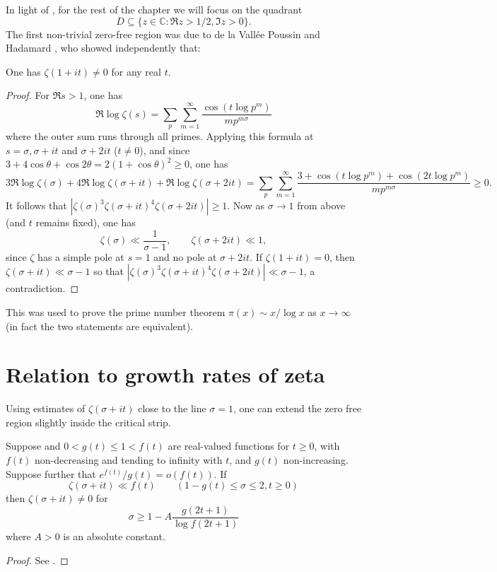 In light of , for the rest of the chapter we will focus on the quadrant
\[
D\subseteq \{z \in \mathbb{C}: \Re z > 1/2, \Im z > 0\}.
\]
The first non-trivial zero-free region was due to de la Vall\'ee Poussin \cite{de_la_vallee_poussin_recherches_1896} and Hadamard \cite{hadamard_distribution_1896}, who showed independently that:


\begin{theorem}
One has $\zeta(1 + it) \ne 0$ for any real $t$.
\end{theorem}
\begin{proof}
For $\Re s > 1$, one has
\[
\Re \log \zeta(s) = \sum_{p}\sum_{m = 1}^{\infty}\frac{\cos (t \log p^m)}{mp^{m\sigma}}
\]
where the outer sum runs through all primes. Applying this formula at $s = \sigma, \sigma + it$ and $\sigma + 2it$ ($t \ne 0$), and since $3 + 4\cos\theta + \cos 2\theta = 2(1 + \cos\theta)^2 \ge 0$, one has
\[
3\Re \log \zeta(\sigma) + 4\Re \log \zeta(\sigma + it) + \Re\log \zeta(\sigma + 2it) = \sum_{p}\sum_{m = 1}^{\infty}\frac{3 + \cos (t \log p^m) + \cos (2t\log p^m)}{mp^{m\sigma}} \ge 0.
\]
It follows that $|\zeta(\sigma)^3 \zeta(\sigma + it)^4 \zeta(\sigma + 2it)| \ge 1$. Now as $\sigma \to 1$ from above (and $t$ remains fixed), one has
\[
\zeta(\sigma) \ll \frac{1}{\sigma - 1},\qquad \zeta(\sigma + 2it) \ll 1,
\]
since $\zeta$ has a simple pole at $s = 1$ and no pole at $\sigma + 2it$. If $\zeta(1 + it) = 0$, then $\zeta(\sigma + it) \ll \sigma - 1$ so that $|\zeta(\sigma)^3 \zeta(\sigma + it)^4 \zeta(\sigma + 2it)| \ll \sigma - 1$, a contradiction.
\end{proof}

This was used to prove the prime number theorem $\pi(x) \sim x/\log x$ as $x \to \infty$ (in fact the two statements are equivalent).

\section{Relation to growth rates of zeta}

Using estimates of $\zeta(\sigma + it)$ close to the line $\sigma = 1$, one can extend the zero free region slightly inside the critical strip.

\begin{lemma}\label{mu_to_zero_free}
Suppose and $0 < g(t) \le 1 < f(t)$ are real-valued functions for $t \ge 0$, with $f(t)$ non-decreasing and tending to infinity with $t$, and $g(t)$ non-increasing. Suppose further that $e^{f(t)}/g(t) = o(f(t))$. If
\[
\zeta(\sigma + it) \ll f(t)\qquad (1 - g(t) \le \sigma \le 2, t \ge 0)
\]
then $\zeta(\sigma + it) \ne 0$ for
\[
\sigma \ge 1 - A\frac{g(2t + 1)}{\log f(2t + 1)}
\]
where $A > 0$ is an absolute constant.
\end{lemma}
\begin{proof}
See \cite[Theorem 3.10]{titchmarsh_theory_1986}.
\end{proof}

